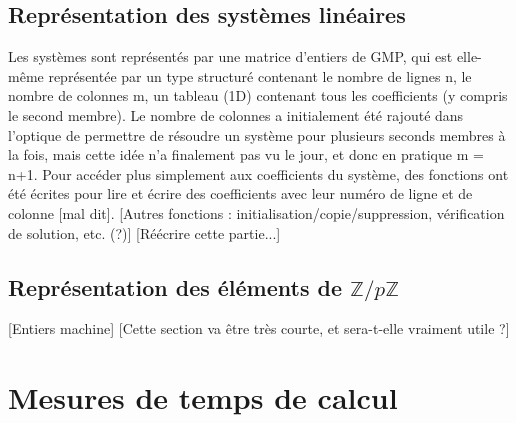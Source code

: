 \documentclass[french]{article}
\begin{document}
\subsection{Représentation des systèmes linéaires}
Les systèmes sont représentés par une matrice d'entiers de GMP, qui est elle-même représentée par un type structuré contenant le nombre de lignes n, le nombre de colonnes m, un tableau (1D) contenant tous les coefficients (y compris le second membre). Le nombre de colonnes a initialement été rajouté dans l'optique de permettre de résoudre un système pour plusieurs seconds membres à la fois, mais cette idée n'a finalement pas vu le jour, et donc en pratique m = n+1.
Pour accéder plus simplement aux coefficients du système, des fonctions ont été écrites pour lire et écrire des coefficients avec leur numéro de ligne et de colonne [mal dit].
[Autres fonctions : initialisation/copie/suppression, vérification de solution, etc. (?)] [Réécrire cette partie...]
\subsection{Représentation des éléments de $\mathbb{Z}/p\mathbb{Z}$}
[Entiers machine] [Cette section va être très courte, et sera-t-elle vraiment utile ?]
\section{Mesures de temps de calcul}
\end{document}
